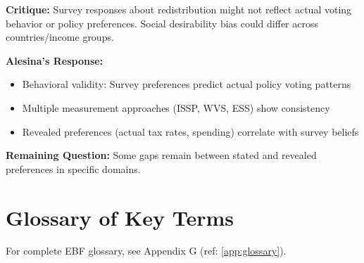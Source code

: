 \textbf{Critique:} Survey responses about redistribution might not reflect actual voting behavior or policy preferences. Social desirability bias could differ across countries/income groups.

\textbf{Alesina's Response:}
\begin{itemize}
\item Behavioral validity: Survey preferences predict actual policy voting patterns
\item Multiple measurement approaches (ISSP, WVS, ESS) show consistency
\item Revealed preferences (actual tax rates, spending) correlate with survey beliefs
\end{itemize}

\textbf{Remaining Question:} Some gaps remain between stated and revealed preferences in specific domains.


\section{Glossary of Key Terms}
\label{sec:alesina-glossary}

For complete EBF glossary, see Appendix G (ref: \ref{app:glossary}).


